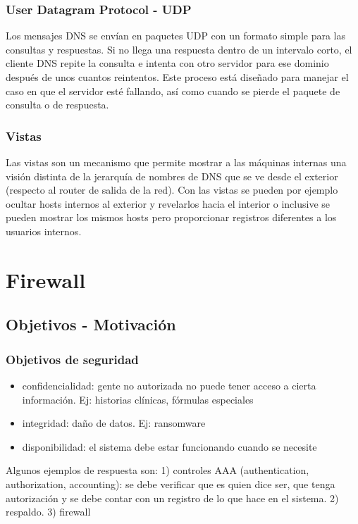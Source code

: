 \documentclass{book}
\begin{document}
	\subsubsection{User Datagram Protocol - UDP}
	Los mensajes DNS se envían en paquetes UDP con un formato simple para las consultas y respuestas. Si no llega una respuesta dentro de un intervalo corto, el cliente DNS repite la consulta e intenta con otro servidor para ese dominio después de unos cuantos reintentos. Este proceso está diseñado para manejar el caso en que el servidor esté fallando, así como cuando se pierde el paquete de consulta o de respuesta.
	
	\subsubsection{Vistas}
	Las vistas son un mecanismo que permite mostrar a las máquinas internas una visión distinta de la jerarquía de nombres de DNS que se ve desde el exterior (respecto al router de salida de la red). Con las vistas se pueden por ejemplo ocultar hosts internos al exterior y revelarlos hacia el interior o inclusive se pueden mostrar los mismos hosts pero proporcionar registros diferentes a los usuarios internos.
	
	\pagebreak
	\section{Firewall}
	
	\subsection{Objetivos - Motivación}
	
	\subsubsection{Objetivos de seguridad}
	\begin{itemize}
		\item confidencialidad: gente no autorizada no puede tener acceso a cierta información. Ej: historias clínicas, fórmulas especiales
		\item integridad: daño de datos. Ej: ransomware
		\item disponibilidad: el sistema debe estar funcionando cuando se necesite
	\end{itemize}
	
	Algunos ejemplos de respuesta son: 1) controles AAA (authentication, authorization, accounting): se debe verificar que es quien dice ser, que tenga autorización y se debe contar con un registro de lo que hace en el sistema. 2) respaldo. 3) firewall
	
\end{document}
